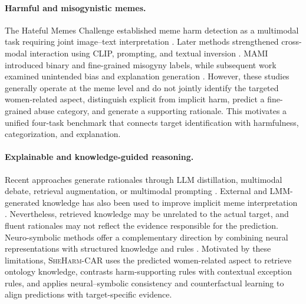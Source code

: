 \documentclass[11pt]{article}
\begin{document}
\paragraph{Harmful and misogynistic memes.}
The Hateful Memes Challenge established meme harm detection as a
multimodal task requiring joint image--text interpretation
\citep{kiela2020hateful}. Later methods strengthened cross-modal
interaction using CLIP, prompting, and textual inversion
\citep{kumar2022hate,cao2022prompthate,burbi2023mapping}.
MAMI introduced binary and fine-grained misogyny labels, while
subsequent work examined unintended bias and explanation generation
\citep{fersini2022semeval,muti2022unibo,
kumari2024unintended,kanwar2025beneath}. However, these studies
generally operate at the meme level and do not jointly identify the
targeted women-related aspect, distinguish explicit from implicit
harm, predict a fine-grained abuse category, and generate a supporting
rationale. This motivates a unified four-task benchmark that connects
target identification with harmfulness, categorization, and
explanation.

\paragraph{Explainable and knowledge-guided reasoning.}
Recent approaches generate rationales through LLM distillation,
multimodal debate, retrieval augmentation, or multimodal prompting
\citep{lin2023beneath,lin2024explainhm,
lin2025explainhm++,hee2025demystifying}. External and
LMM-generated knowledge has also been used to improve implicit meme
interpretation
\citep{grasso2024kermit,tzelepi2025improving,
garg2025just,tripathi2026they}. Nevertheless, retrieved knowledge may
be unrelated to the actual target, and fluent rationales may not
reflect the evidence responsible for the prediction. Neuro-symbolic
methods offer a complementary direction by combining neural
representations with structured knowledge and rules
\citep{colelough2025neuro,liu2025neural,wang2025rule}.
Motivated by these limitations, \textsc{SheHarm-CAR} uses the
predicted women-related aspect to retrieve ontology knowledge,
contrasts harm-supporting rules with contextual exception rules, and
applies neural--symbolic consistency and counterfactual learning to
align predictions with target-specific evidence.


\end{document}
